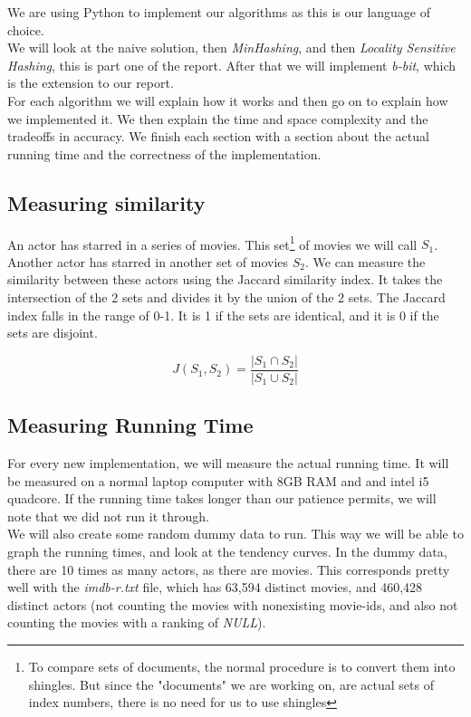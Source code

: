 \documentclass[a4paper,11pt]{article}
\begin{document}
We are using Python to implement our algorithms as this is our language of choice. \\

We will look at the naive solution, then \emph{MinHashing}, and then \emph{Locality Sensitive Hashing}, this is part one of the report. After that we will implement \emph{b-bit}, which is the extension to our report.\\

For each algorithm we will explain how it works and then go on to explain how we implemented it. We then explain the time and space complexity and the tradeoffs in accuracy. We finish each section with a section about the actual running time and the correctness of the implementation. \\


\subsection{Measuring similarity}
An actor has starred in a series of movies. This set\footnote{To compare sets of documents, the normal procedure is to convert them into shingles. But since the "documents" we are working on, are actual sets of index numbers, there is no need for us to use shingles} of movies we will call $S_1$. Another actor has starred in another set of movies $S_2$. We can measure the similarity between these actors using the Jaccard similarity index. It takes the intersection of the 2 sets and divides it by the union of the 2 sets. The Jaccard index falls in the range of 0-1. It is 1 if the sets are identical, and it is 0 if the sets are disjoint.

\begin{equation}
J (S_1, S_2) = \frac{|S_1 \cap S_2|}{|S_1 \cup S_2|}
\end{equation}



\subsection{Measuring Running Time}

For every new implementation, we will measure the actual running time. It will be measured on a normal laptop computer with 8GB RAM and and intel i5 quadcore. If the running time takes longer than our patience permits, we will note that we did not run it through.\\

We will also create some random dummy data to run. This way we will be able to graph the running times, and look at the tendency curves. In the dummy data, there are 10 times as many actors, as there are movies. This corresponds pretty well with the \emph{imdb-r.txt} file, which has 63,594 distinct movies, and 460,428 distinct actors (not counting the movies with nonexisting movie-ids, and also not counting the movies with a ranking of \emph{NULL}).\\
\end{document}
